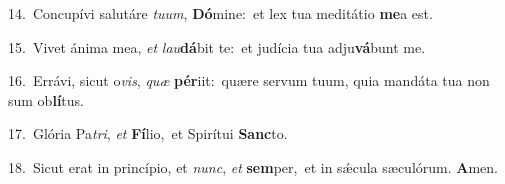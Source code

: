 {\numbfont\textcolor{\numbcolor}{14.}}~Concupívi salutáre \textit{tu}\-\textit{um}, \textbf{Dó}\-mine:~\star et lex tua meditátio \textbf{me}\-a est.\par
{\numbfont\textcolor{\numbcolor}{15.}}~Vivet ánima mea, \textit{et} \textit{lau}\-\textbf{dá}bit te:~\star et judícia tua adju\-\textbf{vá}\-bunt me.\par
{\numbfont\textcolor{\numbcolor}{16.}}~Errávi, sicut o\-\textit{vis}\-, \textit{quæ} \textbf{pér}\-iit:~\star quære servum tuum, quia mandáta tua non sum ob\-\textbf{lí}\-tus.\par
{\numbfont\textcolor{\numbcolor}{17.}}~Glória Pa\-\textit{tri}\-, \textit{et} \textbf{Fí}\-lio,~\star et Spirítui \textbf{Sanc}\-to.\par
{\numbfont\textcolor{\numbcolor}{18.}}~Sicut erat in princípio, et \textit{nunc}\-, \textit{et} \textbf{sem}\-per,~\star et in sǽcula sæculórum. \textbf{A}\-men.\par
